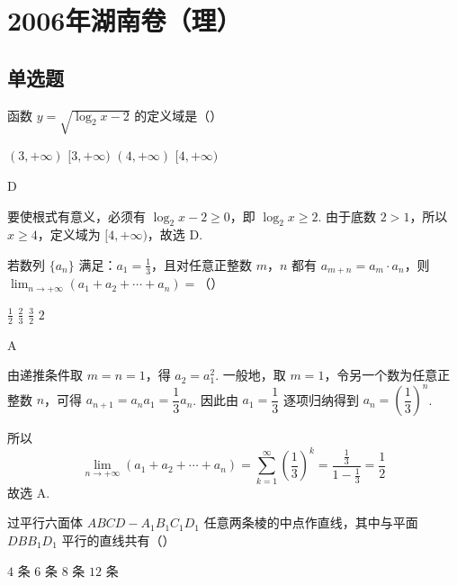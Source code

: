 \chapter{2006年湖南卷（理）}
\section{单选题}
\begin{problem}
函数 \( y = \sqrt{\log_{2} x - 2} \) 的定义域是（\quad）

\choices
    {\((3, +\infty)\)}
    {\([3, +\infty)\)}
    {\((4, +\infty)\)}
    {\([4, +\infty)\)}
\end{problem}

\begin{answer}
D
\end{answer}

\begin{solution}
要使根式有意义，必须有 \(\log_{2}x-2\geqslant0\)，即 \(\log_{2}x\geqslant2\). 由于底数 \(2>1\)，所以 \(x\geqslant4\)，定义域为 \([4,+\infty)\)，故选 D.
\end{solution}

\begin{problem}
若数列 \(\{a_n\}\) 满足：\(a_{1} = \frac{1}{3}\)，且对任意正整数 \(m\)，\(n\) 都有 \(a_{m+n} = a_m \cdot a_n\)，则 \(\displaystyle\lim_{n \to +\infty} (a_1 + a_2 + \cdots + a_n) =\)（\quad）

\choices
    {\(\frac{1}{2}\)}
    {\(\frac{2}{3}\)}
    {\(\frac{3}{2}\)}
    {\(2\)}
\end{problem}

\begin{answer}
A
\end{answer}

\begin{solution}
由递推条件取 \(m=n=1\)，得 \(a_{2}=a_{1}^{2}\). 一般地，取 \(m=1\)，令另一个数为任意正整数 \(n\)，可得 \(a_{n+1}=a_n a_1=\dfrac13a_n\). 因此由 \(a_1=\dfrac13\) 逐项归纳得到 \(a_n=\left(\dfrac13\right)^n\).

所以
\[
\lim_{n\to+\infty}\left(a_1+a_2+\cdots+a_n\right)=\sum_{k=1}^{\infty}\left(\frac13\right)^k=\frac{\frac13}{1-\frac13}=\frac12
\]
故选 A.
\end{solution}

\begin{problem}
过平行六面体 \(ABCD - A_{1}B_{1}C_{1}D_{1}\) 任意两条棱的中点作直线，其中与平面 \(DBB_{1}D_{1}\) 平行的直线共有（\quad）

\choices
    {\(4\) 条}
    {\(6\) 条}
    {\(8\) 条}
    {\(12\) 条}
\end{problem}

